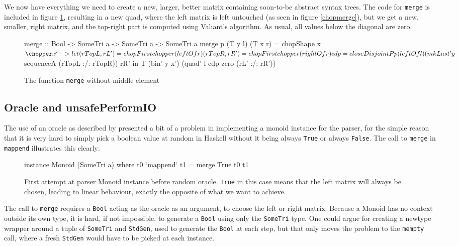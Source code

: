 \documentclass[a4paper,12pt,notitlepage]{report}
\begin{document}
We now have everything we need to create a new, larger, better matrix containing
soon-to-be abstract syntax trees. The code for \texttt{merge} is included in
figure \ref{merge}, resulting in a new quad, where the left matrix is left
untouched (as seen in figure \ref{chopmerge}), but we get a new, smaller, right
matrix, and the top-right part is computed using Valiant's algorithm. As usual,
all values below the diagonal are zero.

\begin{figure}[H]
\begin{code}
merge :: Bool -> SomeTri a -> SomeTri a -> SomeTri a
merge p (T y l) (T x r) = chopShape x $ \chopper x' ->
    let (rTopL, rL') = chopFirst chopper (leftOf r)
        (rTopR, rR') = chopFirst chopper (rightOf r)
        cdp = closeDisjointP p (leftOf l) 
                (mkLast' y $ sequenceA (rTopL :/: rTopR)) rR'
    in T (bin' y x') (quad' l cdp zero (rL' :/: rR'))
\end{code}
\caption{\label{merge} \small The function \texttt{merge} without middle element}
\end{figure}

\subsection{Oracle and unsafePerformIO}
\label{oraclesection}
The use of an oracle as described by \citet{parparsepaper} presented a bit
of a problem in implementing a monoid instance for the parser, for the simple
reason that it is very hard to simply pick a boolean value at random in Haskell
without it being always \texttt{True} or always \texttt{False}. The call to
\texttt{merge} in \texttt{mappend} illustrates this clearly:

\begin{figure}[H]
\begin{code}
instance Monoid (SomeTri a) where
    t0 `mappend` t1 = merge True t0 t1
\end{code}
\caption{\small First attempt at parser Monoid instance before random oracle.
\texttt{True} in this case means that the left matrix will always be chosen,
leading to linear behaviour, exactly the opposite of what we want to achieve.}
\end{figure}

The call to \texttt{merge} requires a \texttt{Bool} acting as the oracle as an
argument, to choose the left or right matrix. Because a Monoid has no context
outside its own type, it is hard, if not impossible, to generate a \texttt{Bool}
using only the \texttt{SomeTri} type.  One could argue for creating a newtype
wrapper around a tuple of \texttt{SomeTri} and \texttt{StdGen}, used to generate
the \texttt{Bool} at each step, but that only moves the problem to the
\texttt{mempty} call, where a fresh \texttt{StdGen} would have to be picked at
each instance.
\end{document}
